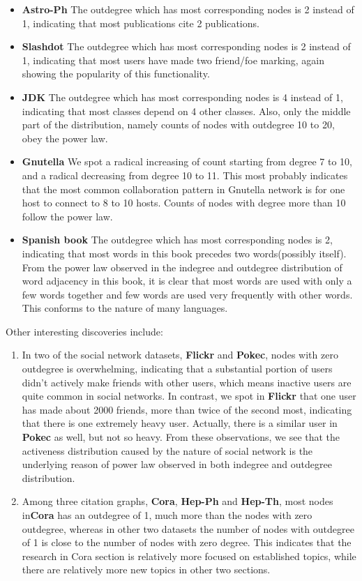 \begin{itemize}
\item \textbf{Astro-Ph} The outdegree which has most corresponding nodes is 2 instead of 1, indicating that most publications cite 2 publications.
\item \textbf{Slashdot} The outdegree which has most corresponding nodes is 2 instead of 1, indicating that most users have made two friend/foe marking, again showing the popularity of this functionality.
\item \textbf{JDK} The outdegree which has most corresponding nodes is 4 instead of 1, indicating that most classes depend on 4 other classes. Also, only the middle part of the distribution, namely counts of nodes with outdegree 10 to 20, obey the power law.
\item \textbf{Gnutella} We spot a radical increasing of count starting from degree 7 to 10, and a radical decreasing from degree 10 to 11. This most probably indicates that the most common collaboration pattern in Gnutella network is for one host to connect to 8 to 10 hosts. Counts of nodes with degree more than 10 follow the power law.
\item \textbf{Spanish book} The outdegree which has most corresponding nodes is 2, indicating that most words in this book precedes two words(possibly itself). From the power law observed in the indegree and outdegree distribution of word adjacency in this book, it is clear that most words are used with only a few words together and few words are used very frequently with other words. This conforms to the nature of many languages.
\end{itemize}

Other interesting discoveries include:
\begin{enumerate}
\item In two of the social network datasets, \textbf{Flickr} and \textbf{Pokec}, nodes with zero outdegree is overwhelming, indicating that a substantial portion of users didn't actively make friends with other users, which means inactive users are quite common in social networks. In contrast, we spot in \textbf{Flickr} that one user has made about 2000 friends, more than twice of the second most, indicating that there is one extremely heavy user. Actually, there is a similar user in \textbf{Pokec} as well, but not so heavy. From these observations, we see that the activeness distribution caused by the nature of social network is the underlying reason of power law observed in both indegree and outdegree distribution.
\item Among three citation graphs, \textbf{Cora}, \textbf{Hep-Ph} and \textbf{Hep-Th}, most nodes in\textbf{Cora} has an outdegree of 1, much more than the nodes with zero outdegree, whereas in other two datasets the number of nodes with outdegree of 1 is close to the number of nodes with zero degree. This indicates that the research in Cora section is relatively more focused on established topics, while there are relatively more new topics in other two sections.
\end{enumerate}


